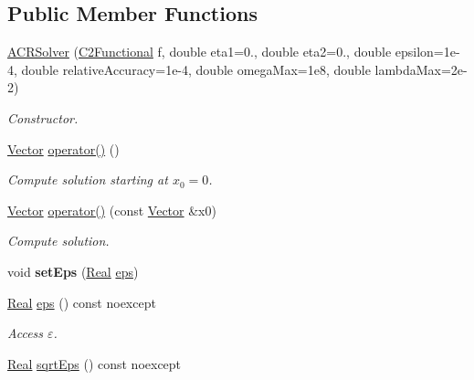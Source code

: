 \subsection*{\-Public \-Member \-Functions}
\begin{DoxyCompactItemize}
\item 
\hyperlink{classSpacy_1_1ACR_1_1ACRSolver_a2b442c8c3149e3d9ba866d9d60c8e014}{\-A\-C\-R\-Solver} (\hyperlink{classSpacy_1_1C2Functional}{\-C2\-Functional} f, double eta1=0., double eta2=0., double epsilon=1e-\/4, double relative\-Accuracy=1e-\/4, double omega\-Max=1e8, double lambda\-Max=2e-\/2)
\begin{DoxyCompactList}\small\item\em \-Constructor. \end{DoxyCompactList}\item 
\hypertarget{classSpacy_1_1ACR_1_1ACRSolver_ae68748adce75b5762ac7005024e29974}{\hyperlink{classSpacy_1_1Vector}{\-Vector} \hyperlink{classSpacy_1_1ACR_1_1ACRSolver_ae68748adce75b5762ac7005024e29974}{operator()} ()}\label{classSpacy_1_1ACR_1_1ACRSolver_ae68748adce75b5762ac7005024e29974}

\begin{DoxyCompactList}\small\item\em \-Compute solution starting at $x_0=0$. \end{DoxyCompactList}\item 
\hyperlink{classSpacy_1_1Vector}{\-Vector} \hyperlink{classSpacy_1_1ACR_1_1ACRSolver_ac7bc2ff6568728c4bd79f49f3596d2bc}{operator()} (const \hyperlink{classSpacy_1_1Vector}{\-Vector} \&x0)
\begin{DoxyCompactList}\small\item\em \-Compute solution. \end{DoxyCompactList}\item 
\hypertarget{classSpacy_1_1Mixin_1_1Eps_a6b4c38a60848c0ab665fb3a81e181786}{void {\bfseries set\-Eps} (\hyperlink{classSpacy_1_1Real}{\-Real} \hyperlink{classSpacy_1_1Mixin_1_1Eps_a812b99b0abc1d78a34b4114907f23f52}{eps})}\label{classSpacy_1_1Mixin_1_1Eps_a6b4c38a60848c0ab665fb3a81e181786}

\item 
\hypertarget{classSpacy_1_1Mixin_1_1Eps_a812b99b0abc1d78a34b4114907f23f52}{\hyperlink{classSpacy_1_1Real}{\-Real} \hyperlink{classSpacy_1_1Mixin_1_1Eps_a812b99b0abc1d78a34b4114907f23f52}{eps} () const noexcept}\label{classSpacy_1_1Mixin_1_1Eps_a812b99b0abc1d78a34b4114907f23f52}

\begin{DoxyCompactList}\small\item\em \-Access $\varepsilon$. \end{DoxyCompactList}\item 
\hypertarget{classSpacy_1_1Mixin_1_1Eps_abd50a47b32614a950189855775a09d05}{\hyperlink{classSpacy_1_1Real}{\-Real} \hyperlink{classSpacy_1_1Mixin_1_1Eps_abd50a47b32614a950189855775a09d05}{sqrt\-Eps} () const noexcept}\label{classSpacy_1_1Mixin_1_1Eps_abd50a47b32614a950189855775a09d05}


\end{DoxyCompactItemize}

